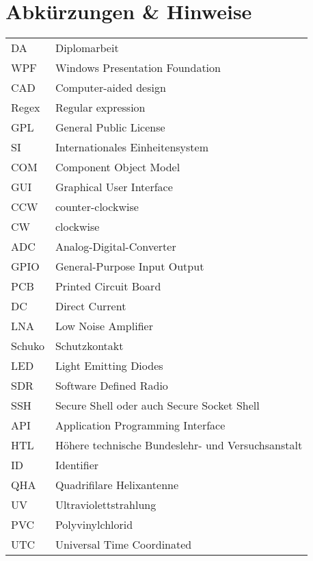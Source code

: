 \section*{Abkürzungen \& Hinweise}
\begin{singlespace}
	\begin{tabular}{ll}
		DA     & Diplomarbeit \\
		WPF    & Windows Presentation Foundation \\
		CAD    & Computer-aided design \\
		Regex  & Regular expression \\
		GPL    & General Public License  \\
		SI     & Internationales Einheitensystem \\
		COM    & Component Object Model \\
		GUI    & Graphical User Interface \\
		CCW	   & counter-clockwise \\
		CW     & clockwise \\
		ADC	   & Analog-Digital-Converter \\
		GPIO   & General-Purpose Input Output \\
		PCB	   & Printed Circuit Board \\
		DC     & Direct Current \\
		LNA    & Low Noise Amplifier \\
		Schuko & Schutzkontakt \\
		LED	   & Light Emitting Diodes \\
		SDR    & Software Defined Radio \\
		SSH    & Secure Shell oder auch Secure Socket Shell \\
		API    & Application Programming Interface \\
		HTL    & Höhere technische Bundeslehr- und Versuchsanstalt \\
		ID     & Identifier \\
		QHA    & Quadrifilare Helixantenne \\
		UV     & Ultraviolettstrahlung \\
		PVC    & Polyvinylchlorid \\
		UTC    & Universal Time Coordinated \\
	\end{tabular}
\end{singlespace}

\pagebreak
